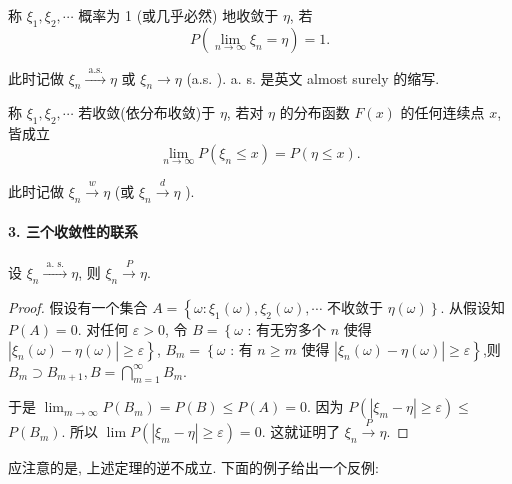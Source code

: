\begin{definition}
    称 $\xi_1, \xi_2, \cdots$ 概率为 1 (或几乎必然) 地收敛于 $\eta$, 若
$$
P\left(\lim _{n \rightarrow \infty} \xi_n=\eta\right)=1 .
$$

此时记做 $\xi_n \stackrel{\text { a.s. }}{\longrightarrow} \eta$ 或 $\xi_n \rightarrow \eta$ (a.s. ). a. s. 是英文 almost surely 的缩写.
\end{definition}

\begin{definition}
    称 $\xi_1, \xi_2, \cdots$ 若收敛(依分布收敛)于 $\eta$, 若对 $\eta$ 的分布函数 $F(x)$ 的任何连续点 $x$, 皆成立
    $$
    \lim _{n \rightarrow \infty} P\left(\xi_n \leqslant x\right)=P(\eta \leqslant x) .
    $$
    
    此时记做 $\xi_n \stackrel{w}{\longrightarrow} \eta$ (或 $\xi_n \stackrel{d}{\longrightarrow} \eta$ ).
\end{definition}

\paragraph{3. 三个收敛性的联系}

\begin{theorem}
    设 $\xi_n \stackrel{\text { a. s. }}{\longrightarrow} \eta$, 则 $\xi_n \stackrel{P}{\longrightarrow} \eta$.
\end{theorem}

\begin{proof}
    假设有一个集合 $A=\left\{\omega: \xi_1(\omega), \xi_2(\omega), \cdots\right.$ 不收敛于 $\left.\eta(\omega)\right\}$. 从假设知 $P(A)=0$. 对任何 $\varepsilon>0$, 令
$B=\left\{\omega\right.$ : 有无穷多个 $n$ 使得 $\left.\left|\xi_n(\omega)-\eta(\omega)\right| \geqslant \varepsilon\right\}$,
$B_m=\left\{\omega\right.$ : 有 $n \geqslant m$ 使得 $\left.\left|\xi_n(\omega)-\eta(\omega)\right| \geqslant \varepsilon\right\}$,则 $B_m \supset B_{m+1}, B=\bigcap_{m=1}^{\infty} B_m$.

于是 $\lim _{m \rightarrow \infty} P\left(B_m\right)=P(B) \leqslant P(A)=0$. 因为 $P\left(\left|\xi_m-\eta\right| \geqslant \varepsilon\right) \leqslant$ $P\left(B_m\right)$. 所以 $\lim P\left(\left|\xi_m-\eta\right| \geqslant \varepsilon\right)=0$. 这就证明了 $\xi_n \stackrel{P}{\longrightarrow} \eta$.
\end{proof}

应注意的是, 上述定理的逆不成立. 下面的例子给出一个反例: 

